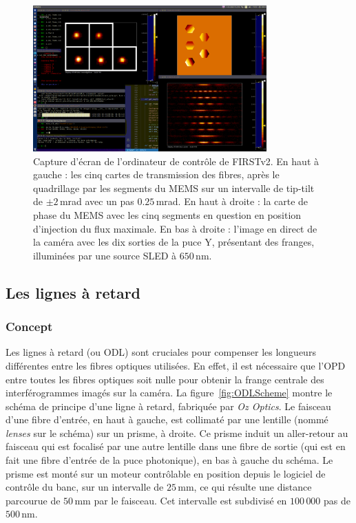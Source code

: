 \begin{figure}[ht!]
    \centering
    \includegraphics[width=0.8\textwidth]{Figure_Chap2/20220505_5TC_AY_InjectionOpti_Fringes_Meudon.png}
    \caption[Capture d'écran de l'ordinateur de contrôle de FIRSTv2 montrant une optimisation de l'injection et les interférogrammes.]{Capture d'écran de l'ordinateur de contrôle de FIRSTv2. En haut à gauche : les cinq cartes de transmission des fibres, après le quadrillage par les segments du MEMS sur un intervalle de tip-tilt de $\pm 2 \,$mrad avec un pas $0.25 \,$mrad. En haut à droite : la carte de phase du MEMS avec les cinq segments en question en position d'injection du flux maximale. En bas à droite : l'image en direct de la caméra avec les dix sorties de la puce Y, présentant des franges, illuminées par une source SLED à $650 \,$nm.}
    \label{fig:OptiInj}
\end{figure}


\subsection{Les lignes à retard}

\subsubsection{Concept}

Les lignes à retard (ou \ac{ODL}) sont cruciales pour compenser les longueurs différentes entre les fibres optiques utilisées. En effet, il est nécessaire que l'\ac{OPD} entre toutes les fibres optiques soit nulle pour obtenir la frange centrale des interférogrammes imagés sur la caméra. La figure~\ref{fig:ODLScheme} montre le schéma de principe d'une ligne à retard, fabriquée par \textit{Oz Optics}. Le faisceau d'une fibre d'entrée, en haut à gauche, est collimaté par une lentille (nommé \textit{lenses} sur le schéma) sur un prisme, à droite. Ce prisme induit un aller-retour au faisceau qui est focalisé par une autre lentille dans une fibre de sortie (qui est en fait une fibre d'entrée de la puce photonique), en bas à gauche du schéma. Le prisme est monté sur un moteur contrôlable en position depuis le logiciel de contrôle du banc, sur un intervalle de $25 \,$mm, ce qui résulte une distance parcourue de $50 \,$mm par le faisceau. Cet intervalle est subdivisé en $100\,000$ pas de $500 \,$nm.


